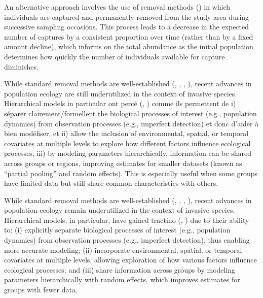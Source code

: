 \documentclass[
  11pt,
  a4paper,
]{article}
\begin{document}
An alternative approach involves the use of removal methods () in which individuals are captured and permanently removed from the study area during successive sampling occasions. This process leads to a decrease in the expected number of captures by a consistent proportion over time (rather than by a fixed amount decline), which informs on the total abundance as the initial population determines how quickly the number of individuals available for capture diminishes.

While standard removal methods are well-established (, , , ), recent advances in population ecology are still underutilized in the context of invasive species. Hierarchical models in particular ont percé (, ) comme ils permettent de i) séparer clairement/formellent the biological processes of interest (e.g., population dynamics) from observation processes (e.g., imperfect detection) et donc d'aider à bien modéliser, et ii) allow the inclusion of environmental, spatial, or temporal covariates at multiple levels to explore how different factors influence ecological processes, iii) by modeling parameters hierarchically, information can be shared across groups or regions, improving estimates for smaller datasets (known as ``partial pooling'' and random effects). This is especially useful when some groups have limited data but still share common characteristics with others.

While standard removal methods are well-established (, , , ), recent advances in population ecology remain underutilized in the context of invasive species. Hierarchical models, in particular, have gained tractino (, ) due to their ability to: (i) explicitly separate biological processes of interest (e.g., population dynamics) from observation processes (e.g., imperfect detection), thus enabling more accurate modeling; (ii) incorporate environmental, spatial, or temporal covariates at multiple levels, allowing exploration of how various factors influence ecological processes; and (iii) share information across groups by modeling parameters hierarchically with random effects, which improves estimates for groups with fewer data.
\end{document}
